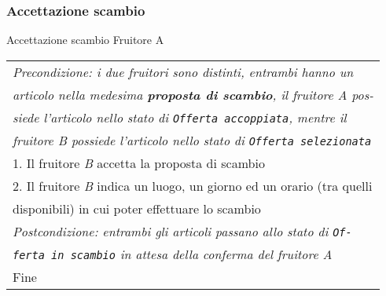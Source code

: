 \begin{minipage}{\textwidth}
    \subsubsection{Accettazione scambio}
    \usecase
        {Accettazione scambio}
        {
            Fruitore A\\
        }
        {
            \begin{tabular}{l}
                \textit{Precondizione: i due fruitori sono distinti, entrambi hanno un}\\
                \textit{articolo nella medesima \textbf{proposta di scambio}, il fruitore A pos-}\\
                \textit{siede l'articolo nello stato di \texttt{Offerta accoppiata}, mentre il}\\
                \textit{fruitore B possiede l'articolo nello stato di \texttt{Offerta selezionata}}\\
                1. Il fruitore \textit{B} accetta la proposta di scambio\\
                2. Il fruitore \textit{B} indica un luogo, un giorno ed un orario (tra quelli\\
                disponibili) in cui poter effettuare lo scambio\\
                \textit{Postcondizione: entrambi gli articoli passano allo stato di \texttt{Of-}}\\
                \textit{\texttt{ferta in scambio} in attesa della conferma del fruitore A}\\
                Fine
            \end{tabular}\\

            \\

}
\end{minipage}
